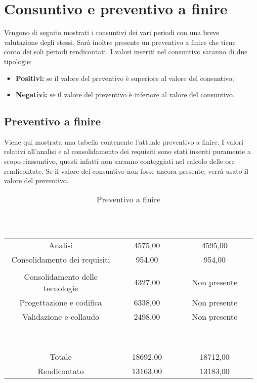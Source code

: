 \section{Consuntivo e preventivo a finire}
\label{consuntivo_preventivo_a_finire}
Vengono di seguito mostrati i consuntivi dei vari periodi con una breve valutazione degli stessi. Sarà inoltre presente un preventivo a finire che tiene conto dei soli periodi rendicontati. I valori inseriti nel consuntivo saranno di due tipologie:
\begin{itemize}
	\item \textbf{Positivi:} se il valore del preventivo è superiore al valore del consuntivo;
	\item \textbf{Negativi:} se il valore del preventivo è inferiore al valore del consuntivo.
\end{itemize}



\subsection{Preventivo a finire}\label{Paf}
Viene qui mostrata una tabella contenente l'attuale preventivo a finire. I valori relativi all'analisi e al consolidamento dei requisiti sono stati inseriti puramente a scopo riassuntivo, questi infatti non saranno conteggiati nel calcolo delle ore rendicontate. Se il valore del consuntivo non fosse ancora presente, verrà usato il valore del preventivo.
\begin{table}[H]
	\centering
	\begin{tabular}{|c|c|c|}
	\rowcolor{darkblue} 
		\textcolor{white}{Periodo}		&\textcolor{white}{Preventivo €}&	\textcolor{white}{Consuntivo €}\\ \hline
		Analisi							&	4575,00						&	4595,00 \\ \hline
		Consolidamento dei requisiti	&	954,00						&	954,00 \\ \hline
		\rowcolor{darkblue} \multicolumn{3}{|c|}{\textcolor{white}{Rendicontato}}\\ \hline
		Consolidamento delle tecnologie	&	4327,00						&	Non presente \\ \hline
		Progettazione e codifica		&	6338,00						&	Non presente \\ \hline
		Validazione e collaudo			&	2498,00						&	Non presente \\ \hline
		\rowcolor{darkblue}				&\textcolor{white}{Preventivo €}&	\textcolor{white}{Preventivo a finire €}\\ \hline
		Totale							&	18692,00					&	18712,00 \\ \hline
		Rendicontato					&	13163,00					&	13183,00 \\ \hline
	\end{tabular}
	\caption{Preventivo a finire}
\end{table}